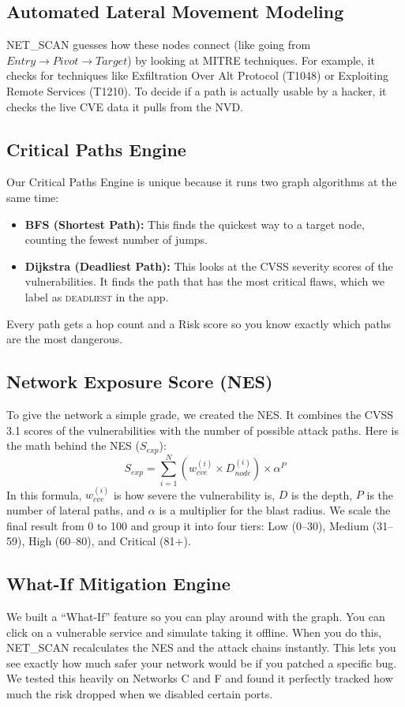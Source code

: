 \documentclass[conference]{IEEEtran}
\begin{document}
\subsection{Automated Lateral Movement Modeling}
NET\_SCAN guesses how these nodes connect (like going from $Entry \rightarrow Pivot \rightarrow Target$) by looking at MITRE techniques. For example, it checks for techniques like Exfiltration Over Alt Protocol (T1048) or Exploiting Remote Services (T1210). To decide if a path is actually usable by a hacker, it checks the live CVE data it pulls from the NVD.

\subsection{Critical Paths Engine}
Our Critical Paths Engine is unique because it runs two graph algorithms at the same time:
\begin{itemize}
    \item \textbf{BFS (Shortest Path):} This finds the quickest way to a target node, counting the fewest number of jumps.
    \item \textbf{Dijkstra (Deadliest Path):} This looks at the CVSS severity scores of the vulnerabilities. It finds the path that has the most critical flaws, which we label as \textsc{deadliest} in the app.
\end{itemize}
Every path gets a hop count and a Risk score so you know exactly which paths are the most dangerous.

\subsection{Network Exposure Score (NES)}
To give the network a simple grade, we created the NES. It combines the CVSS 3.1 scores of the vulnerabilities with the number of possible attack paths.
Here is the math behind the NES ($S_{exp}$):
\begin{equation}
S_{exp} = \sum_{i=1}^{N} (w_{cve}^{(i)} \times D_{node}^{(i)}) \times \alpha^{P}
\end{equation}
In this formula, $w_{cve}^{(i)}$ is how severe the vulnerability is, $D$ is the depth, $P$ is the number of lateral paths, and $\alpha$ is a multiplier for the blast radius. We scale the final result from 0 to 100 and group it into four tiers: Low (0--30), Medium (31--59), High (60--80), and Critical (81+).

\subsection{What-If Mitigation Engine}
We built a ``What-If'' feature so you can play around with the graph. You can click on a vulnerable service and simulate taking it offline. When you do this, NET\_SCAN recalculates the NES and the attack chains instantly. This lets you see exactly how much safer your network would be if you patched a specific bug. We tested this heavily on Networks C and F and found it perfectly tracked how much the risk dropped when we disabled certain ports.
\end{document}
